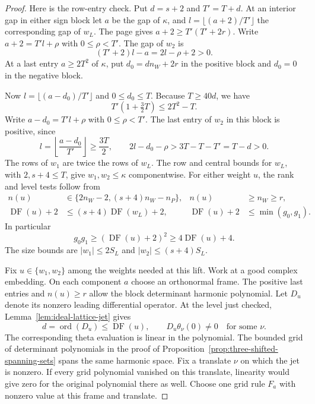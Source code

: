 \begin{proof}
Here is the row-entry check. Put \(d=s+2\) and \(T'=T+d\).
At an interior gap in either sign block let \(a\) be the gap of
\(\kappa\), and \(l=\lfloor(a+2)/T'\rfloor\) the corresponding
gap of \(w_L\). The page gives \(a+2\ge T'(T'+2r)\). Write
\(a+2=T'l+\rho\) with \(0\le\rho<T'\). The gap of \(w_2\) is
\[
 (T'+2)l-a=2l-\rho+2>0.
\] At a last entry \(a\ge2T^2\) of
\(\kappa\), put \(d_0=dn_W+2r\) in the positive block and
\(d_0=0\) in the negative block.

Now
\(l=\lfloor(a-d_0)/T'\rfloor\) and \(0\le d_0\le T\).
Because \(T\ge40d\), we have
\[
 T'\left(1+\tfrac32T\right)\le 2T^2-T .
\]
Write \(a-d_0=T'l+\rho\) with \(0\le\rho<T'\). The last entry
of \(w_2\) in this block is positive, since
\[
 l=\left\lfloor\frac{a-d_0}{T'}\right\rfloor\ge\frac{3T}{2},
 \qquad 2l-d_0-\rho>3T-T-T'=T-d>0 .
\]
The rows of \(w_1\) are twice the rows of \(w_L\).
The row and central bounds for \(w_L\), with \(2,s+4\le T\),
give \(w_1,w_2\le\kappa\) componentwise.
For either weight \(u\), the rank and level tests follow from
\[
 \begin{aligned}
 n(u)&\in\{2n_W-2,(s+4)n_W-n_P\}, &n(u)&\ge n_W\ge r,\\
 \operatorname{DF}(u)+2&\le (s+4)\operatorname{DF}(w_L)+2,
 &\operatorname{DF}(u)+2&\le\min(g_0,g_1).
 \end{aligned}
\]
In particular 
\[
  g_0g_1\ge(\operatorname{DF}(u)+2)^2
\ge4\operatorname{DF}(u)+4.
\]
 The size bounds are
\(\lvert w_1\rvert\le2S_L\) and \(\lvert w_2\rvert\le(s+4)S_L\).
\label{cor:selected-height-sections-2}

Fix \(u\in\{w_1,w_2\}\) among the weights needed at this lift.
Work at a good complex embedding. On each component \(a\) choose an
orthonormal frame. The positive last entries and \(n(u)\ge r\)
allow the block determinant harmonic polynomial. Let \(D_u\) denote its nonzero leading differential operator.
At the level just checked, Lemma~\ref{lem:ideal-lattice-jet} gives
\[
 d=\operatorname{ord}(D_u)\le\operatorname{DF}(u),\qquad
        D_u\theta_\nu(0)\ne0\quad\text{for some }\nu .
\]
The corresponding theta evaluation is linear in the polynomial.
The bounded grid of determinant polynomials in the proof of
Proposition~\ref{prop:three-shifted-spanning-sets} spans the same
harmonic space. Fix a translate \(\nu\) on which the jet is nonzero. If every grid
polynomial vanished on this translate, linearity would give zero for the
original polynomial there as well. Choose one grid rule \(F_a\) with
nonzero value at this frame and translate.


\end{proof}
